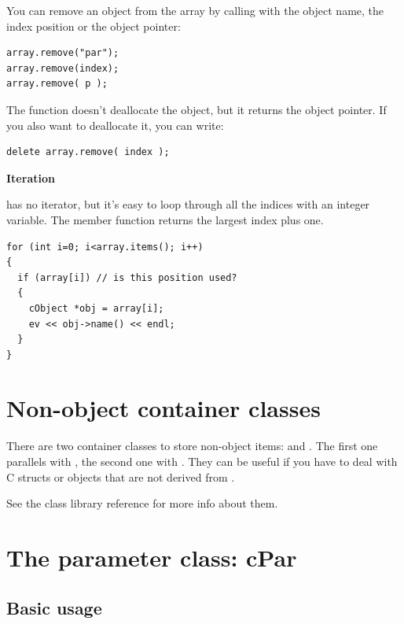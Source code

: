 You can remove an object from the array by calling 
with the object name, the index position or the object pointer:

\begin{Verbatim}
array.remove("par");
array.remove(index); 
array.remove( p ); 
\end{Verbatim}


The  function doesn't deallocate the object, but it
returns the object pointer. If you also want to deallocate it, you can
write:

\begin{Verbatim}
delete array.remove( index ); 
\end{Verbatim}

\textbf{Iteration}


 has no iterator, but it's easy to loop through all the
indices with an integer variable. The  member function
returns the largest index plus one.

\begin{Verbatim}
for (int i=0; i<array.items(); i++)
{
  if (array[i]) // is this position used?
  {
    cObject *obj = array[i];
    ev << obj->name() << endl;
  }
}
\end{Verbatim}




\section{Non-object container classes}

There are two container classes to store non-object
items:  and
.  The first one parallels with , the
second one with . They can be useful if you have to
deal with C structs or objects that are not derived from
.

See the class library reference for more info about them.





\section{The parameter class: cPar}

\subsection{Basic usage}

